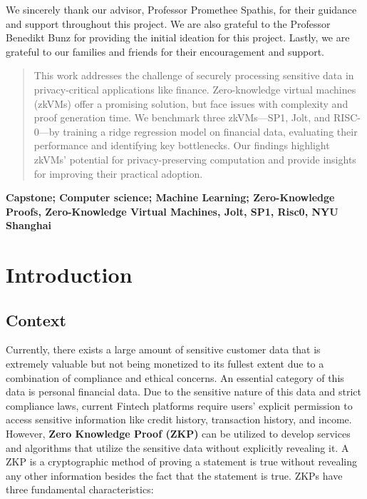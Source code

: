 \documentclass{scrartcl}
\begin{document}
\vspace{1cm}

\begin{acknowledgements}
	We sincerely thank our advisor, Professor Promethee Spathis, for their guidance and support throughout this project. We are also grateful to the Professor Benedikt Bunz for providing the initial ideation for this project. Lastly, we are grateful to our families and friends for their encouragement and support.\end{acknowledgements}

\newpage

\begin{abstract}
	This work addresses the challenge of securely processing sensitive data in privacy-critical applications like finance. Zero-knowledge virtual machines (zkVMs) offer a promising solution, but face issues with complexity and proof generation time. We benchmark three zkVMs—SP1, Jolt, and RISC-0—by training a ridge regression model on financial data, evaluating their performance and identifying key bottlenecks. Our findings highlight zkVMs’ potential for privacy-preserving computation and provide insights for improving their practical adoption.
\end{abstract}
\vspace{1cm}

\begin{keywords}
	\centering
	\textbf{Capstone; Computer science; Machine Learning; Zero-Knowledge Proofs, Zero-Knowledge Virtual Machines, Jolt, SP1, Risc0, NYU Shanghai}
\end{keywords}

\newpage



\doublespacing
\tableofcontents
\singlespacing

\newpage

\doublespacing

\section{Introduction}

\subsection{Context}

Currently, there exists a large amount of sensitive customer data that is extremely valuable but not being monetized to its fullest extent due to a combination of compliance and ethical concerns. An essential category of this data is personal financial data. Due to the sensitive nature of this data and strict compliance laws, current Fintech platforms require users’ explicit permission to access sensitive information like credit history, transaction history, and income. However, \textbf{Zero Knowledge Proof (ZKP)} can be utilized to develop services and algorithms that utilize the sensitive data without explicitly revealing it. A ZKP is a cryptographic method of proving a statement is true without revealing any other information besides the fact that the statement is true. ZKPs have three fundamental characteristics:
\end{document}

